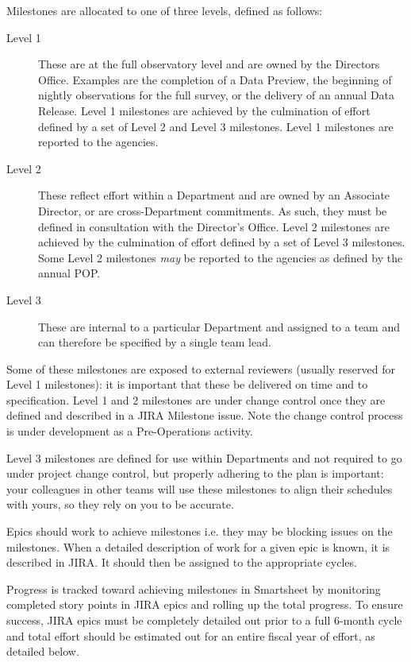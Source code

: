 Milestones are allocated to one of three levels, defined as follows:

\begin{description}
\item[Level 1] These are at the full observatory level and are owned by the Directors Office.
Examples are the completion of a Data Preview, the beginning of nightly observations for the full survey, or the delivery of an annual Data Release.
Level 1 milestones are achieved by the culmination of effort defined by a set of Level 2 and Level 3 milestones.
Level 1 milestones are reported to the agencies.
\item[Level 2] These reflect effort within a Department and are owned by an Associate Director, or are cross-Department commitments.
As such, they must be defined in consultation with the Director's Office.
Level 2 milestones are achieved by the culmination of effort defined by a set of Level 3 milestones.
Some Level 2 milestones {\it may} be reported to the agencies as defined by the annual POP.
\item[Level 3] These are internal to a particular Department and assigned to a team and can therefore be specified by a single team lead.
\end{description}

Some of these milestones are exposed to external reviewers (usually reserved for Level 1 milestones): it is important that these be delivered on time and to specification.
Level 1 and 2 milestones are under change control once they are defined and described in a \gls{JIRA} Milestone issue. Note the change control process is under development as a Pre-Operations activity. 

Level 3 milestones are defined for use within Departments and not required to go under project change control, but properly adhering to the plan is important: your colleagues in other teams will use these milestones to align their schedules with yours, so they rely on you to be accurate.

Epics should work to achieve milestones i.e. they may be blocking issues on the milestones.
When a detailed description of work for a given \gls{epic} is known, it is described in \gls{JIRA}.
It should then be assigned to the appropriate \glspl{cycle}.

Progress is tracked toward achieving milestones in Smartsheet by monitoring completed story points in \gls{JIRA} epics and rolling up the total progress.
To ensure success, \gls{JIRA} epics must be completely detailed out prior to a full 6-month cycle and total effort should be estimated out for an entire fiscal year of effort, as detailed below.

